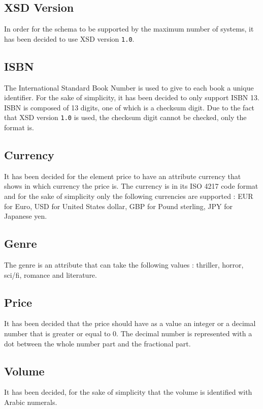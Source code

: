 \documentclass{article}
\begin{document}

\subsection{XSD Version}
In order for the schema to be supported by the maximum number of systems, it has been decided to use XSD version \texttt{1.0}.

\subsection{ISBN}
The International Standard Book Number is used to give to each book a unique identifier. For the sake of simplicity, it has been decided to only support ISBN 13. ISBN is composed of 13 digits, one of which is a checksum digit. Due to the fact that XSD version \texttt{1.0} is used, the checksum digit cannot be checked, only the format is.

\subsection{Currency}
It has been decided for the element price to have an attribute currency that shows in which currency the price is.
The currency is in its ISO 4217 code format and for the sake of simplicity only the following currencies are supported : EUR for Euro, USD for United States dollar, GBP for Pound sterling, JPY for Japanese yen.

\subsection{Genre}
The genre is an attribute that can take the following values : thriller, horror, sci/fi, romance and literature.

\subsection{Price}
It has been decided that the price should have as a value an integer or a decimal number that is greater or equal to 0. The decimal number is represented with a dot between the whole number part and the fractional part.

\subsection{Volume}
It has been decided, for the sake of simplicity that the volume is identified with Arabic numerals.
\end{document}
